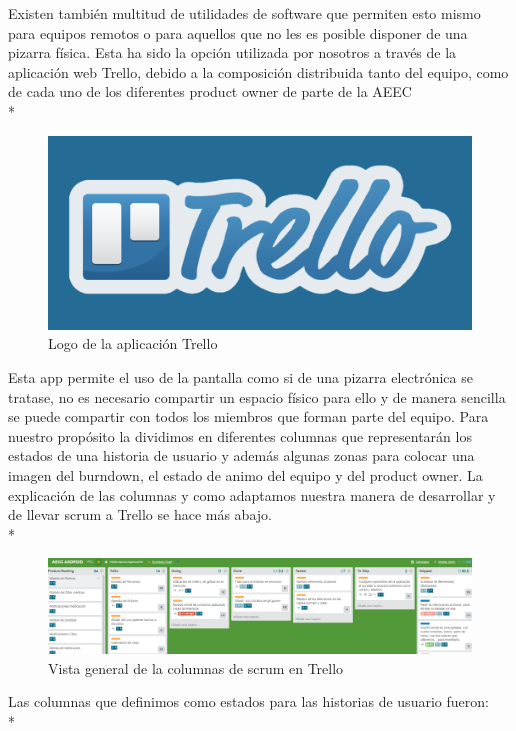 \documentclass[../pfc.tex]{subfiles}
\begin{document}
	Existen también multitud de utilidades de software que permiten esto mismo para equipos remotos o para aquellos que no les es posible disponer de una pizarra física. Esta ha sido la opción utilizada por nosotros a través de la aplicación web Trello, debido a la composición distribuida tanto del equipo, como de cada uno de los diferentes product owner de parte de la AEEC\\*
	
	\begin{figure}[H]
		\centering
		\includegraphics[width=0.5\linewidth]{../images/TrelloLogo}
		\caption{Logo de la aplicación Trello}
		\label{fig:trello}
	\end{figure}
	
	Esta app permite el uso de la pantalla como si de una pizarra electrónica se tratase, no es necesario compartir un espacio físico para ello y de manera sencilla se puede compartir con todos los miembros que forman parte del equipo. Para nuestro propósito la dividimos en diferentes columnas que representarán los estados de una historia de usuario y además algunas zonas para colocar una imagen del burndown, el estado de animo del equipo y del product owner. La explicación de las columnas y como adaptamos nuestra manera de desarrollar y de llevar scrum a Trello se hace más abajo.\\*
	
	\begin{figure}[H]
		\centering
		\includegraphics[width=1\linewidth]{../images/trellocomphorizontal}
		\caption{Vista general de la columnas de scrum en Trello}
		\label{fig:trelloComp}
	\end{figure}
	
	Las columnas que definimos como estados para las historias de usuario fueron:\\*
	
\end{document}
